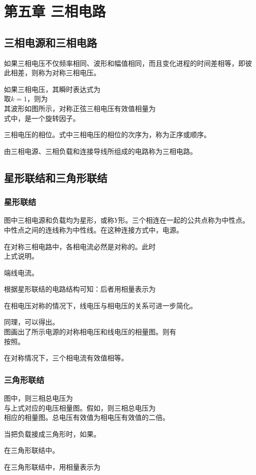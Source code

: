 \chapter{第五章 三相电路}

\section{三相电源和三相电路}
如果三相电压不仅频率相同、波形和幅值相同，而且变化进程的时间差相等，即彼此相差，则称为对称三相电压。

如果三相电压，其瞬时表达式为
\[
\]
取$k=1$，则为
\[
\]
其波形如图所示，对称正弦三相电压有效值相量为
\[
\]
式中，是一个旋转因子。

三相电压的相位。式中三相电压的相位的次序为，称为正序或顺序。

由三相电源、三相负载和连接导线所组成的电路称为三相电路。

\section{星形联结和三角形联结}
\subsection{星形联结}
图中三相电源和负载均为星形，或称$Y$形。三个相连在一起的公共点称为中性点。中性点之间的连线称为中性线。在这种连接方式中，电源。

在对称三相电路中，各相电流必然是对称的。此时
\[
\]
上式说明。

端线电流。

根据星形联结的电路结构可知：后者用相量表示为
\[
\]

在相电压对称的情况下，线电压与相电压的关系可进一步简化。

同理，可以得出。
\[
\]
图画出了所示电源的对称相电压和线电压的相量图。则有
\[
\]
按照。

在对称情况下，三个相电流有效值相等。

\subsection{三角形联结}
图中，则三相总电压为
\[
\]
与上式对应的电压相量图。假如，则三相总电压为
\[
\]
相应的相量图。总电压有效值为相电压有效值的二倍。

当把负载接成三角形时，如果。

在三角形联结中。

在三角形联结中，用相量表示为
\[
\]

